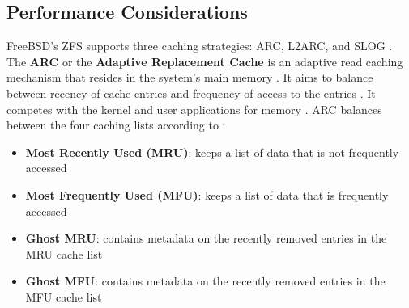 \subsection{Performance Considerations} \label{performance-considerations} %

FreeBSD's ZFS supports three caching strategies: ARC, L2ARC, and SLOG \parencite{khurshid2025}. The
\textbf{ARC} or the \textbf{Adaptive Replacement Cache} is an adaptive read caching mechanism that resides in the system's main
memory \parencite{khurshid2025}. It aims to balance between recency of cache entries and frequency of access to the entries
\parencite{khurshid2025}. It competes with the kernel and user applications for memory \parencite{khurshid2025}. ARC balances
between the four caching lists according to \textcite{khurshid2025}:

\begin{itemize}
	\item \textbf{Most Recently Used (MRU)}: keeps a list of data that is not frequently accessed

	\item \textbf{Most Frequently Used (MFU)}: keeps a list of data that is frequently accessed

	\item \textbf{Ghost MRU}: contains metadata on the recently removed entries in the MRU cache list

	\item \textbf{Ghost MFU}: contains metadata on the recently removed entries in the MFU cache list
\end{itemize}

